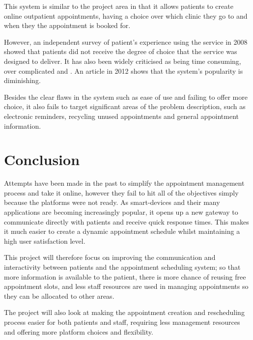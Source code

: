 This system is similar to the project area in that it allows patients to create online outpatient appointments, having a choice over which clinic they go to and when they the appointment is booked for.

However, an independent survey of patient's experience using the service in 2008 showed that patients did not receive the degree of choice that the service was designed to deliver\cite{Green}. It has also been widely criticised as being time consuming, over complicated and . An article in 2012\cite{C&BFailure} shows that the system's popularity is diminishing.

Besides the clear flaws in the system such as ease of use and failing to offer more choice, it also fails to target significant areas of the problem description, such as electronic reminders, recycling unused appointments and general appointment information.


\section{Conclusion}

Attempts have been made in the past to simplify the appointment management process and take it online, however they fail to hit all of the objectives simply because the platforms were not ready. As smart-devices and their many applications are becoming increasingly popular, it opens up a new gateway to communicate directly with patients and receive quick response times. This makes it much easier to create a dynamic appointment schedule whilst maintaining a high user satisfaction level.

This project will therefore focus on improving the communication and interactivity between patients and the appointment scheduling system; so that more information is available to the patient, there is more chance of reusing free appointment slots, and less staff resources are used in managing appointments so they can be allocated to other areas.

The project will also look at making the appointment creation and rescheduling process easier for both patients and staff, requiring less management resources and offering more platform choices and flexibility.